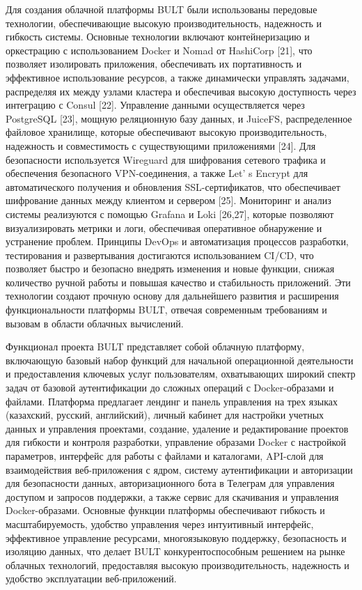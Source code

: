 \begin{multicols}{2}
Для создания облачной платформы BULT были использованы передовые
технологии, обеспечивающие высокую производительность, надежность и
гибкость системы. Основные технологии включают контейнеризацию и
оркестрацию с использованием Docker и Nomad от HashiCorp {[}21{]}, что
позволяет изолировать приложения, обеспечивать их портативность и
эффективное использование ресурсов, а также динамически управлять
задачами, распределяя их между узлами кластера и обеспечивая высокую
доступность через интеграцию с Consul {[}22{]}. Управление данными
осуществляется через PostgreSQL {[}23{]}, мощную реляционную базу
данных, и JuiceFS, распределенное файловое хранилище, которые
обеспечивают высокую производительность, надежность и совместимость с
существующими приложениями {[}24{]}. Для безопасности используется
Wireguard для шифрования сетевого трафика и обеспечения безопасного
VPN-соединения, а также Let' s Encrypt для
автоматического получения и обновления SSL-сертификатов, что
обеспечивает шифрование данных между клиентом и сервером {[}25{]}.
Мониторинг и анализ системы реализуются с помощью Grafana и Loki
{[}26,27{]}, которые позволяют визуализировать метрики и логи,
обеспечивая оперативное обнаружение и устранение проблем. Принципы
DevOps и автоматизация процессов разработки, тестирования и
развертывания достигаются использованием CI/CD, что позволяет быстро и
безопасно внедрять изменения и новые функции, снижая количество ручной
работы и повышая качество и стабильность приложений. Эти технологии
создают прочную основу для дальнейшего развития и расширения
функциональности платформы BULT, отвечая современным требованиям и
вызовам в области облачных вычислений.

Функционал проекта BULT представляет собой облачную платформу,
включающую базовый набор функций для начальной операционной деятельности
и предоставления ключевых услуг пользователям, охватывающих широкий
спектр задач от базовой аутентификации до сложных операций с
Docker-образами и файлами. Платформа предлагает лендинг и панель
управления на трех языках (казахский, русский, английский), личный
кабинет для настройки учетных данных и управления проектами, создание,
удаление и редактирование проектов для гибкости и контроля разработки,
управление образами Docker с настройкой параметров, интерфейс для работы
с файлами и каталогами, API-слой для взаимодействия веб-приложения с
ядром, систему аутентификации и авторизации для безопасности данных,
авторизационного бота в Телеграм для управления доступом и запросов
поддержки, а также сервис для скачивания и управления Docker-образами.
Основные функции платформы обеспечивают гибкость и масштабируемость,
удобство управления через интуитивный интерфейс, эффективное управление
ресурсами, многоязыковую поддержку, безопасность и изоляцию данных, что
делает BULT конкурентоспособным решением на рынке облачных технологий,
предоставляя высокую производительность, надежность и удобство
эксплуатации веб-приложений.
\end{multicols}

